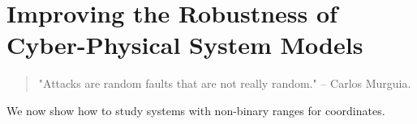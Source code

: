 \chapter{Improving the Robustness of Cyber-Physical System Models}
\label{ch:CPSRobustness}
\begin{quote}
    "Attacks are random faults that are not really random." -- Carlos Murguia.  
\end{quote}


We now show how to study systems with non-binary ranges for coordinates. 
